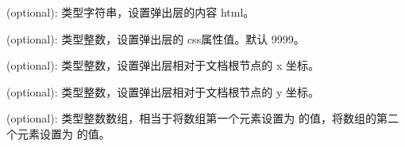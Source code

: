 \documentclass[letterpaper,10pt,english]{sphinxmanual}
\begin{document}

\begin{fulllineitems}
\label{api/component/overlay/overlay:Overlay.content}
(optional): 类型字符串，设置弹出层的内容 html。

\end{fulllineitems}



\begin{fulllineitems}
\label{api/component/overlay/overlay:Overlay.zIndex}
(optional): 类型整数，设置弹出层的  css属性值。默认 9999。

\end{fulllineitems}



\begin{fulllineitems}
\label{api/component/overlay/overlay:Overlay.x}
(optional): 类型整数，设置弹出层相对于文档根节点的 x 坐标。

\end{fulllineitems}



\begin{fulllineitems}
\label{api/component/overlay/overlay:Overlay.y}
(optional): 类型整数，设置弹出层相对于文档根节点的 y 坐标。

\end{fulllineitems}



\begin{fulllineitems}
\label{api/component/overlay/overlay:Overlay.xy}
(optional): 类型整数数组，相当于将数组第一个元素设置为 {\hyperref[api/component/overlay/overlay:Overlay.x]{}} 的值，将数组的第二个元素设置为 {\hyperref[api/component/overlay/overlay:Overlay.y]{}} 的值。

\end{fulllineitems}


\end{document}

